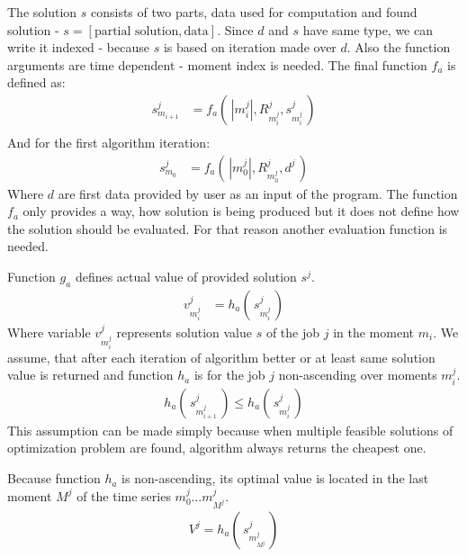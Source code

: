 The solution $s$ consists of two parts, data used for computation and found solution - $s = [\text{partial solution}, \text{data}]$.
Since $d$ and $s$ have same type, we can write it indexed - because $s$ is based on iteration made over $d$.
Also the function arguments are time dependent - moment index is needed.
The final function $f_{a}$ is defined as:
\begin{align*}
    s_{m_{i+1}}^{j} &= f_{a}(\, |m_{i}^{j}|, R_{m_{i}^{j}}^{j}, s_{m_{i}^{j}}^{j}\,)\\
\end{align*}
And for the first algorithm iteration:
\begin{align*}
    s_{m_{0}}^{j} &= f_{a}(\, |m_{0}^{j}|, R_{m_{0}^{j}}^{j}, d^{j}\,)
\end{align*}
Where $d$ are first data provided by user as an input of the program.
The function $f_{a}$ only provides a way,
how solution is being produced but it does not define how the solution should be evaluated.
For that reason another evaluation function is needed.

\bigskip

\noindent Function $g_{a}$ defines actual value of provided solution $s^{j}$.
\begin{align*}
    v_{m_{i}^{j}}^{j} &= h_{a}(\, s_{m_{i}^{j}}^{j} \,)
\end{align*}
Where variable $v_{m_{i}^{j}}^{j}$ represents solution value $s$ of the job $j$ in the moment $m_{i}$.
We assume, that after each iteration of algorithm better or at least same solution value is returned
and function $h_{a}$ is for the job $j$ non-ascending over moments $m_{i}^{j}$.
\begin{align*}
    h_{a}(\, s_{m_{i+1}^{j}}^{j} \,) \leq h_{a}(\, s_{m_{i}^{j}}^{j} \,)
\end{align*}
This assumption can be made simply because when multiple feasible solutions of optimization problem are found,
algorithm always returns the cheapest one.

Because function $h_{a}$ is non-ascending,
its optimal value is located in the last moment $M^j$ of the time series $m_{0}^{j} \dots m_{M^{j}}^{j}$.
\begin{align*}
    V^{j} = h_{a}(\, s_{m_{M^{j}}^{j}}^{j} \,)
\end{align*}

